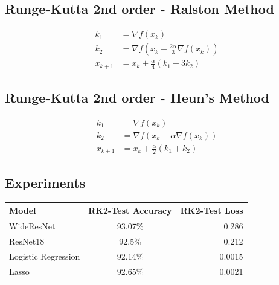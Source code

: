 \documentclass[a0,portrait]{a0poster}
\begin{document}
\begin{multicols}{3}


\subsection*{Runge-Kutta 2nd order - Ralston Method}

\begin{align*}
k_1 &= \nabla f(x_k) \\
k_2 &= \nabla f(x_k - \frac{2\alpha}{3} \nabla f(x_k)) \\
x_{k+1} &= x_k + \frac{\alpha}{4}(k_1 + 3k_2)
\end{align*}

\subsection*{Runge-Kutta 2nd order - Heun's Method}

\begin{align*}
k_1 &= \nabla f(x_k) \\
k_2 &= \nabla f(x_k - \alpha \nabla f(x_k)) \\
x_{k+1} &= x_k + \frac{\alpha}{2}(k_1 + k_2)
\end{align*}

\subsection*{Experiments}
\begin{center}
  \begin{tabular}{ | l | c | r| }
    \hline
    Model & RK2-Test Accuracy & RK2-Test Loss \\ \hline
    WideResNet & 93.07\% & 0.286  \\ \hline
    ResNet18 & 92.5\% & 0.212 \\ \hline
    Logistic Regression & 92.14\% & 0.0015  \\ \hline
    Lasso & 92.65\% & 0.0021 \\ \hline
    \hline
  \end{tabular}
\end{center}


\end{multicols}
\end{document}
